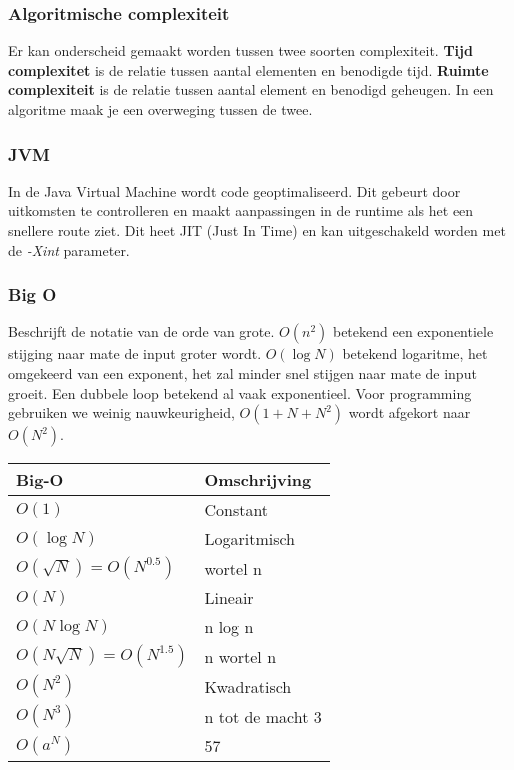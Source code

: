 \subsubsection{Algoritmische complexiteit}
Er kan onderscheid gemaakt worden tussen twee soorten complexiteit.
\textbf{Tijd complexitet} is de relatie tussen aantal elementen en benodigde tijd.
\textbf{Ruimte complexiteit} is de relatie tussen aantal element en benodigd geheugen.
In een algoritme maak je een overweging tussen de twee.

\subsubsection{JVM}
In de Java Virtual Machine wordt code geoptimaliseerd.
Dit gebeurt door uitkomsten te controlleren en maakt aanpassingen in de runtime als het een snellere route ziet.
Dit heet JIT (Just In Time) en kan uitgeschakeld worden met de \textit{-Xint} parameter.

\subsubsection{Big O}
Beschrijft de notatie van de orde van grote.
$O(n^2)$ betekend een exponentiele stijging naar mate de input groter wordt.
$O(\log N)$ betekend logaritme, het omgekeerd van een exponent, het zal minder snel stijgen naar mate de input groeit.
Een dubbele loop betekend al vaak exponentieel. 
Voor programming gebruiken we weinig nauwkeurigheid, $O(1+N+N^2)$ wordt afgekort naar $O(N^2)$.

\begin{center}
    \begin{tabular}{ll}
        Big-O                       & Omschrijving \\
        \midrule
        $O(1)$                      & Constant \\
        $O(\log N)$                 & Logaritmisch \\
        $O(\sqrt{N}) = O(N^{0.5})$    & wortel n \\
        $O(N)$                      & Lineair \\
        $O(N \log N)$               & n log n \\
        $O(N \sqrt{N}) = O(N^{1.5})$  & n wortel n \\
        $O(N^2)$                    & Kwadratisch \\
        $O(N^3)$                    & n tot de macht 3 \\
        $O(a^N)$                    & 57 \\
        \bottomrule
    \end{tabular}
\end{center}
